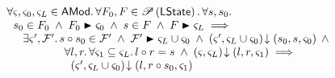 \newpage	
\begin{lemma}[]\label{lem:amodWitness}
%
\[
\begin{array}{l}
	\for{\amod{}, \amod{0}, \amod{L} \in \AMods} \for{F_0, F \in \pset{\LStates}} \for{s, s_0}\\
	\hspace*{0.2cm} s_0 \in F_0 \;\land\; F_0 \strictfences \amod{0} \;\land\; s \in F \;\land\; F \strictfences \amod{L} 
	\implies \\
	\hspace*{0.5cm} \exsts{\amod{}', \fence{}'} s \composeL s_0 \in \fence{}' \;\land\; \fence{}' \strictfences \amod{L} \cup \amod{0} \;\land\; 
	 \extendsAM{\amod{}', \amod{L} \cup \amod{0}}{s_0}{s}{\amod{0}} \;\land\\
	 \hspace*{1.8cm}\for{l, r}\for{\amod{1} \subseteq \amod{L} } l \composeL r = s \;\land\; \extendsAM{\amod{}, \amod{L}}{l}{r}{\amod{1}} \implies\\
	 \hspace*{2cm}  \extendsAM{\amod{}', \amod{L} \cup \amod{0}}{l}{r \composeL s_0}{\amod{1}}


\end{array}\]
\end{lemma}

